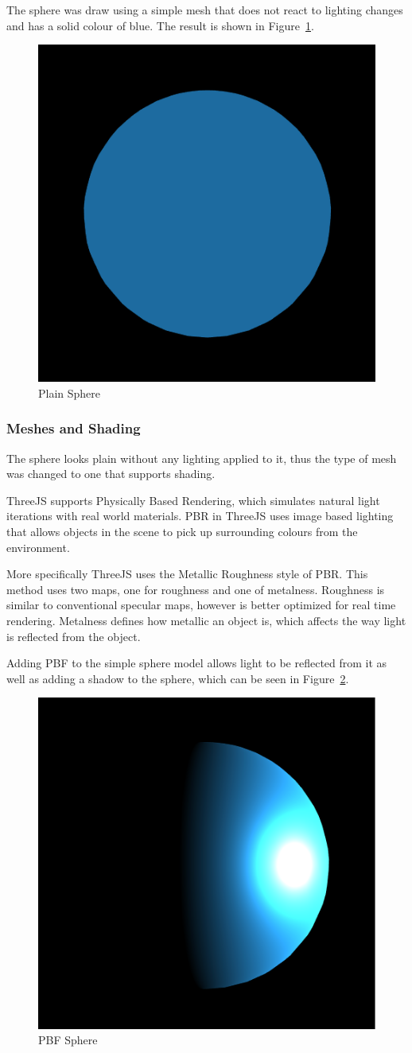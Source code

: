\documentclass[]{article}
\begin{document}
The sphere was draw using a simple mesh that does not react to lighting changes and has a solid colour of blue.
The result is shown in Figure~\ref{fig:plainSphere}.

\begin{figure}[H]
   \centering
   \includegraphics[width=0.5\linewidth]{images/plain_sphere}
   \caption{Plain Sphere}
   \label{fig:plainSphere}
\end{figure}

\subsubsection{Meshes and Shading}

The sphere looks plain without any lighting applied to it,
thus the type of mesh was changed to one that supports shading.

ThreeJS supports Physically Based Rendering, which simulates natural light iterations with real world materials\cite{physically_based_rendering}.
PBR in ThreeJS uses image based lighting that allows objects in the scene to pick up surrounding colours from the environment.

More specifically ThreeJS uses the Metallic Roughness style of PBR.
This method uses two maps, one for roughness and one of metalness.
Roughness is similar to conventional specular maps,
however is better optimized for real time rendering\cite{meshstandardmaterial_2017}.
Metalness defines how metallic an object is,
which affects the way light is reflected from the object.

Adding PBF to the simple sphere model allows light to be reflected from it as well as adding a shadow to the sphere,
which can be seen in Figure~\ref{fig:pbf_sphere}.

\begin{figure}[H]
   \centering
   \includegraphics[width=0.5\linewidth]{images/pbf_sphere}
   \caption{PBF Sphere}
   \label{fig:pbf_sphere}
\end{figure}
\end{document}
